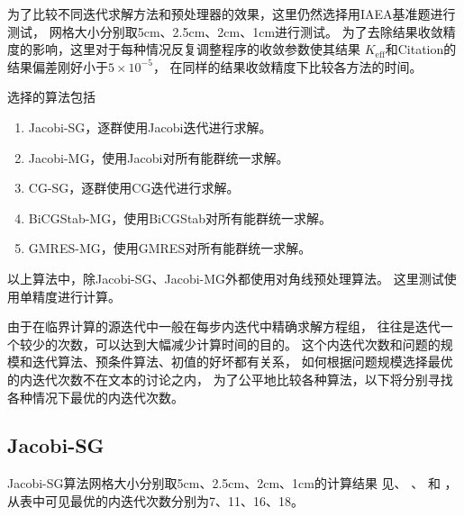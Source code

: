 为了比较不同迭代求解方法和预处理器的效果，这里仍然选择用IAEA基准题进行测试，
网格大小分别取5cm、2.5cm、2cm、1cm进行测试。
为了去除结果收敛精度的影响，这里对于每种情况反复调整程序的收敛参数使其结果
$K_\mathrm{eff}$和Citation的结果偏差刚好小于$5\times10^{-5}$，
在同样的结果收敛精度下比较各方法的时间。

选择的算法包括
\begin{enumerate}
\item Jacobi-SG，逐群使用Jacobi迭代进行求解。
\item Jacobi-MG，使用Jacobi对所有能群统一求解。
\item CG-SG，逐群使用CG迭代进行求解。
\item BiCGStab-MG，使用BiCGStab对所有能群统一求解。
\item GMRES-MG，使用GMRES对所有能群统一求解。
\end{enumerate}
以上算法中，除Jacobi-SG、Jacobi-MG外都使用对角线预处理算法。
这里测试使用单精度进行计算。

由于在临界计算的源迭代中一般在每步内迭代中精确求解方程组，
往往是迭代一个较少的次数，可以达到大幅减少计算时间的目的。
这个内迭代次数和问题的规模和迭代算法、预条件算法、初值的好坏都有关系，
如何根据问题规模选择最优的内迭代次数不在文本的讨论之内，
为了公平地比较各种算法，以下将分别寻找各种情况下最优的内迭代次数。

\subsection{Jacobi-SG}
\label{sec:equsolve.iter.jacobi-sg}

Jacobi-SG算法网格大小分别取5cm、2.5cm、2cm、1cm的计算结果
见、%
、%
和%
，
从表中可见最优的内迭代次数分别为7、11、16、18。

